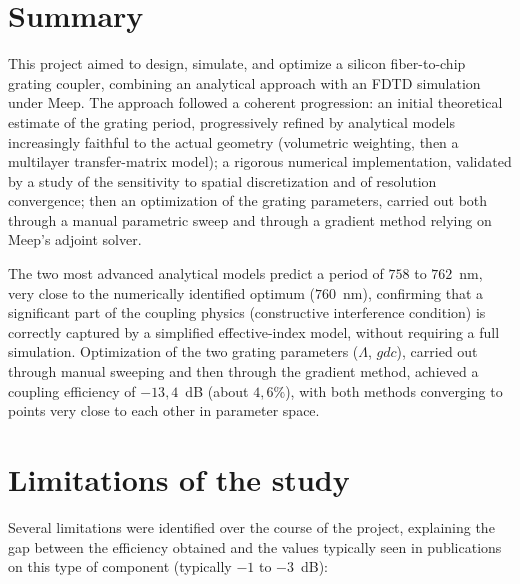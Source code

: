 \documentclass[a4paper,11pt]{report}
\begin{document}
\section{Summary}

This project aimed to design, simulate, and optimize a silicon fiber-to-chip grating coupler, combining an analytical approach with an FDTD simulation under Meep. The approach followed a coherent progression: an initial theoretical estimate of the grating period, progressively refined by analytical models increasingly faithful to the actual geometry (volumetric weighting, then a multilayer transfer-matrix model); a rigorous numerical implementation, validated by a study of the sensitivity to spatial discretization and of resolution convergence; then an optimization of the grating parameters, carried out both through a manual parametric sweep and through a gradient method relying on Meep's adjoint solver.

The two most advanced analytical models predict a period of $758$ to $762$~nm, very close to the numerically identified optimum ($760$~nm), confirming that a significant part of the coupling physics (constructive interference condition) is correctly captured by a simplified effective-index model, without requiring a full simulation. Optimization of the two grating parameters ($\Lambda$, $gdc$), carried out through manual sweeping and then through the gradient method, achieved a coupling efficiency of $-13{,}4$~dB (about $4{,}6\%$), with both methods converging to points very close to each other in parameter space.

\section{Limitations of the study}

Several limitations were identified over the course of the project, explaining the gap between the efficiency obtained and the values typically seen in publications on this type of component (typically $-1$ to $-3$~dB):
\end{document}
